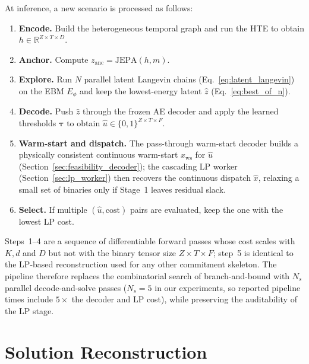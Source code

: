 \documentclass{article}
\begin{document}
At inference, a new scenario is processed as follows:
\begin{enumerate}[noitemsep]
  \item \textbf{Encode.} Build the heterogeneous temporal graph and run the HTE to obtain $h \in \mathbb{R}^{Z\times T\times D}$.
  \item \textbf{Anchor.} Compute $z_{\mathrm{anc}} = \mathrm{JEPA}(h, m)$.
  \item \textbf{Explore.} Run $N$ parallel latent Langevin chains (Eq.~\ref{eq:latent_langevin}) on the EBM $E_\phi$ and keep the lowest-energy latent $\hat z$ (Eq.~\ref{eq:best_of_n}).
  \item \textbf{Decode.} Push $\hat z$ through the frozen AE decoder and apply the learned thresholds $\boldsymbol\tau$ to obtain $\hat u \in \{0,1\}^{Z\times T\times F}$.
  \item \textbf{Warm-start and dispatch.} The pass-through warm-start decoder builds a physically consistent continuous warm-start $x_{\mathrm{ws}}$ for $\hat u$ (Section~\ref{sec:feasibility_decoder}); the cascading LP worker (Section~\ref{sec:lp_worker}) then recovers the continuous dispatch $\hat x$, relaxing a small set of binaries only if Stage~1 leaves residual slack.
  \item \textbf{Select.} If multiple $(\hat u, \mathrm{cost})$ pairs are evaluated, keep the one with the lowest LP cost.
\end{enumerate}
Steps~1--4 are a sequence of differentiable forward passes whose cost scales with $K, d$ and $D$ but not with the binary tensor size $Z\times T\times F$; step~5 is identical to the LP-based reconstruction used for any other commitment skeleton. The pipeline therefore replaces the combinatorial search of branch-and-bound with $N_s$ parallel decode-and-solve passes ($N_s{=}5$ in our experiments, so reported pipeline times include $5\times$ the decoder and LP cost), while preserving the auditability of the LP stage.



\section{Solution Reconstruction}
\label{sec:reconstruction}
\end{document}
